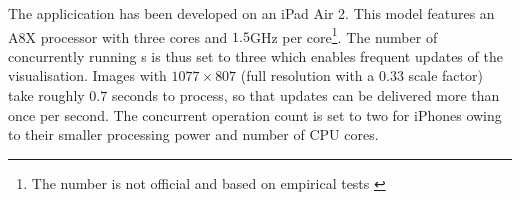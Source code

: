 The applicication has been developed on an iPad Air 2. This model features an
A8X processor with three cores and $1.5$GHz per core\footnote{The number is not
official and based on empirical tests \citep{a8x}}. The number of concurrently
running s is thus set to three which
enables frequent updates of the visualisation. Images with $1077\times 807$
(full resolution with a $0.33$ scale factor) take roughly $0.7$ seconds to
process, so that updates can be delivered more than once per second. The
concurrent operation count is set to two for iPhones owing to their smaller
processing power and number of CPU cores.


